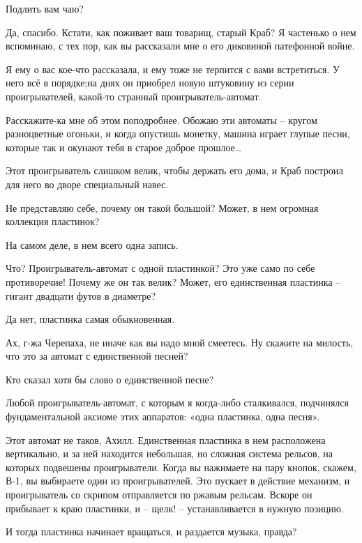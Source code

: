 \documentclass[../main.tex]{subfiles}
\begin{document}
\begin{dialogue}
 Подлить вам чаю?

 Да, спасибо. Кстати, как поживает ваш товарищ, старый Краб? Я частенько о нем вспоминаю, с тех пор, как вы рассказали мне о его диковиной патефонной войне.

 Я ему о вас кое-что рассказала, и ему тоже не терпится с вами встретиться. У него всё в порядке;на днях он приобрел новую штуковину из серии проигрывателей, какой-то странный проигрыватель-автомат.

 Расскажите-ка мне об этом поподробнее. Обожаю эти автоматы \--- кругом разноцветные огоньки, и когда опустишь монетку, машина играет глупые песни, которые так и окунают тебя в старое доброе прошлое\ldots{}

 Этот проигрыватель слишком велик, чтобы держать его дома, и Краб построил для него во дворе специальный навес.

 Не представляю себе, почему он такой большой? Может, в нем огромная коллекция пластинок?

 На самом деле, в нем всего одна запись.

 Что? Проигрыватель-автомат с одной пластинкой? Это уже само по себе противоречие! Почему же он так велик? Может, его единственная пластинка \--- гигант двадцати футов в диаметре?

 Да нет, пластинка самая обыкновенная.

 Ах, г-жа Черепаха, не иначе как вы надо мной смеетесь. Ну скажите на милость, что это за автомат с единственной песней?

 Кто сказал хотя бы слово о единственной песне?

 Любой проигрыватель-автомат, с которым я когда-либо сталкивался, подчинялся фундаментальной аксиоме этих аппаратов: «одна пластинка, одна песня».

 Этот автомат не таков, Ахилл. Единственная пластинка в нем расположена вертикально, и за ней находится небольшая, но сложная система рельсов, на которых подвешены проигрыватели. Когда вы нажимаете на пару кнопок, скажем, \mbox{В-1}, вы выбираете один из проигрывателей. Это пускает в действие механизм, и проигрыватель со скрипом отправляется по ржавым рельсам. Вскоре он прибывает к краю пластинки, и \--- щелк! \--- устанавливается в нужную позицию.

 И тогда пластинка начинает вращаться, и раздается музыка, правда?


\end{dialogue}
\end{document}
